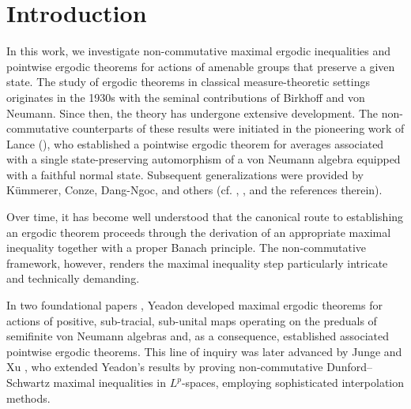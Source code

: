 \documentclass[11pt]{amsart}
\theoremstyle{definition}
\theoremstyle{myremark}
\numberwithin{equation}{section}
\begin{document}
	
	
	
	\begin{abstract}
		In this article, we establish maximal inequalities and deduce ergodic theorems for state-preserving actions of amenable, locally compact, second-countable groups on tracial non-commutative $L^1$-spaces. As a further consequence, in combination with the Neveu decomposition, we obtain a stochastic ergodic theorem for amenable group actions.

	\end{abstract}
	
	
	
	\maketitle 


 
	
	\section{Introduction}
  
In this work, we investigate non-commutative maximal ergodic inequalities and pointwise ergodic theorems for actions of amenable groups that preserve a given state. The study of ergodic theorems in classical measure-theoretic settings originates in the 1930s with the seminal contributions of Birkhoff and von Neumann. Since then, the theory has undergone extensive development. The non-commutative counterparts of these results were initiated in the pioneering work of Lance (\cite{Lance1976}), who established a pointwise ergodic theorem for averages associated with a single state-preserving automorphism of a von Neumann algebra equipped with a faithful normal state. Subsequent generalizations were provided by Kümmerer, Conze, Dang-Ngoc, and others (cf. \cite{Kuemmerer1978}, \cite{Conze1978}, and the references therein).


Over time, it has become well understood that the canonical route to establishing an ergodic theorem proceeds through the derivation of an appropriate maximal inequality together with a proper Banach principle. The non-commutative framework, however, renders the maximal inequality step particularly intricate and technically demanding.

In two foundational papers \cite{Yeadon1977, Yeadon1980}, Yeadon developed maximal ergodic theorems for actions of positive, sub-tracial, sub-unital maps operating on the preduals of semifinite von Neumann algebras and, as a consequence, established associated pointwise ergodic theorems. This line of inquiry was later advanced by Junge and Xu \cite{Junge2007}, who extended Yeadon’s results by proving non-commutative Dunford–Schwartz maximal inequalities in $L^p$-spaces, employing sophisticated interpolation methods.
\end{document}

